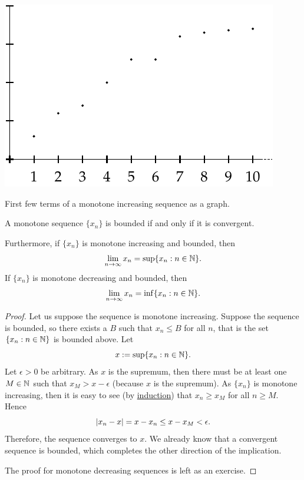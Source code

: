 \begin{myfigureht}
\includegraphics{figures/sequence-increasing}
\caption{First few terms of a monotone increasing sequence as a
graph.\label{figsequenceincreasing}}
\end{myfigureht}

\begin{prop} \label{prop:monotoneconv}
A monotone sequence $\{ x_n \}$ is bounded if and only if it is convergent.

Furthermore, if $\{ x_n \}$ is monotone increasing and bounded, then
\begin{equation*}
\lim_{n\to \infty} x_n = \sup \{ x_n : n \in {\mathbb{N}} \} .
\end{equation*}
If $\{ x_n \}$ is monotone decreasing and bounded, then
\begin{equation*}
\lim_{n\to \infty} x_n = \inf \{ x_n : n \in {\mathbb{N}} \} .
\end{equation*}
\end{prop}

\begin{proof}
Let us suppose the sequence is monotone increasing.  Suppose 
the sequence is bounded, so there exists a $B$
such that $x_n \leq B$ for all $n$, that is the set
$\{ x_n : n \in  {\mathbb{N}} \}$ is bounded above.  Let
\begin{equation*}
x := \sup \{ x_n : n \in {\mathbb{N}} \} .
\end{equation*}
Let $\epsilon > 0$ be arbitrary.  As $x$ is the supremum, then
there must be at least one $M \in {\mathbb{N}}$ such that $x_{M} > x-\epsilon$
(because $x$ is the supremum).  As $\{ x_n \}$ is monotone increasing,
then it is easy to see (by \hyperref[induction:thm]{induction}) that
$x_n \geq x_{M}$ for all $n \geq M$.  Hence
\begin{equation*}
\left\lvert {x_n-x} \right\rvert = x-x_n \leq x-x_{M} < \epsilon  .
\end{equation*}
Therefore, the sequence converges to $x$.
We already know that a convergent sequence is bounded, which completes the
other direction of the implication.

The proof for monotone decreasing sequences is left as an exercise.
\end{proof}

